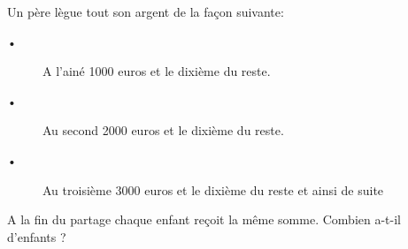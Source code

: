 
Un père lègue tout son argent de la façon suivante: 
\begin{description}
\item[•] A l'ainé 1000 euros et le dixième du reste. 
\item[•] Au second 2000 euros et le dixième du reste.
\item[•] Au troisième 3000 euros et le dixième du reste et ainsi de suite
\end{description}
A la fin du partage chaque enfant reçoit la même somme. 
Combien a-t-il d'enfants ? 